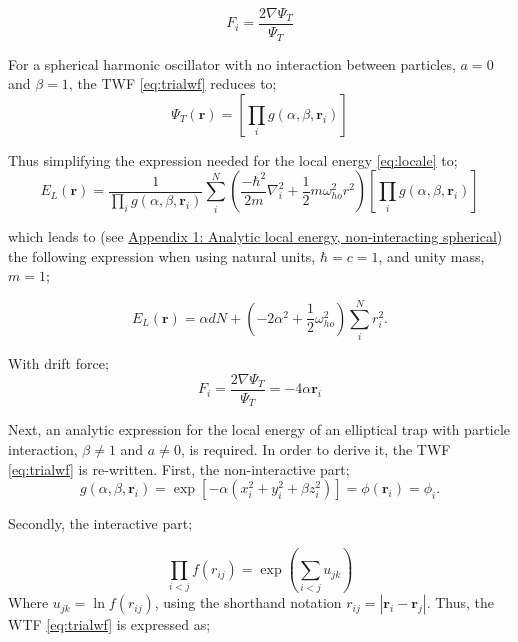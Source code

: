 \documentclass[%
oneside,                 %
final,                   %
10pt]{article}
\newcounter{subsubsubsection}[subsubsection]
\begin{document}
\begin{equation}
F_i = \frac{2\nabla \Psi_T}{\Psi_T}
\end{equation} 

For a spherical harmonic oscillator with no interaction between particles, $a=0$ and $\beta = 1$, the TWF \eqref{eq:trialwf} reduces to;
\begin{equation}
\Psi_T (\bm r)= \left[
    \prod_i g(\alpha,\beta,\mathbf{r}_i)
 \right]
\end{equation}

Thus simplifying the expression needed for the local energy \eqref{eq:locale} to;
\begin{equation*}
    E_L(\mathbf{r}) =\frac{1}{ 
    \prod_i g(\alpha,\beta,\mathbf{r}_i)
}  \sum_i^N \left(\frac{-\hbar^2}{2m}{\nabla }_{i}^2 +\frac{1}{2}m\omega_{ho}^2r^2 \right)  \left[
    \prod_i g(\alpha,\beta,\mathbf{r}_i)
 \right]
 \end{equation*}

which leads to (see \hyperref[APP_2:le_1]{Appendix 1: Analytic local energy, non-interacting spherical}) the following expression when using natural units, $\hbar = c = 1 $, and unity mass, $m=1$;

\begin{equation}
        E_L(\mathbf{r}) =  \alpha d N + \left( - 2 \alpha^2    + \frac{1}{2} \omega_{ho}^2\right)  \sum_i^N r_i^2 .
\label{eq:locale_analytic_1}
\end{equation}

With drift force;
\begin{equation}
F_i = \frac{2\nabla \Psi_T}{\Psi_T}= -4\alpha \mathbf{r}_i 
\end{equation}
 
Next, an analytic expression for the local energy of an elliptical trap with particle interaction, $\beta\neq 1$ and $a \neq 0$, is required. In order to derive it, the TWF \eqref{eq:trialwf} is re-written. First, the non-interactive part; 
\begin{equation*}
    g(\alpha,\beta,\mathbf{r}_i) = \exp{\left[-\alpha(x_i^2+y_i^2+\beta
    z_i^2)\right]}= \phi(\mathbf{r}_i) = \phi_i.
\end{equation*}

Secondly, the interactive part;

\begin{equation}
\prod_{i<j} f(r_{ij})= \exp{\left(\sum_{i<j}u_{jk}\right)}
\end{equation}
Where $u_{jk}=\ln{f(r_{ij})}$, using the shorthand notation $r_{ij}=|\mathbf{r}_i-\mathbf{r}_j|$. Thus, the WTF \eqref{eq:trialwf} is expressed as;
\end{document}
